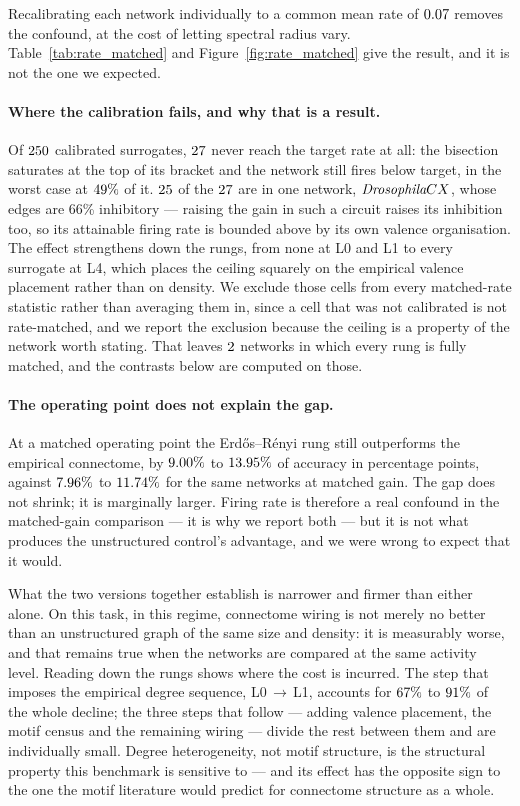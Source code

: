 Recalibrating each network individually to a common mean rate of $0.07$ removes
the confound, at the cost of letting spectral radius vary. Table~\ref{tab:rate_matched}
and Figure~\ref{fig:rate_matched} give the result, and it is not the one we expected.

\paragraph{Where the calibration fails, and why that is a result.}
Of $250$ calibrated surrogates, $27$ never reach the target rate at
all: the bisection saturates at the top of its bracket and the network still fires below
target, in the worst case at $49\%$ of it. $25$ of the
$27$ are in one network, $\textit{Drosophila} CX$, whose edges are 66\%
inhibitory --- raising the gain in such a circuit raises its inhibition too, so its
attainable firing rate is bounded above by its own valence organisation. The effect
strengthens down the rungs, from none at L0 and L1 to every surrogate at L4, which
places the ceiling squarely on the empirical valence placement rather than on density. We exclude those cells from every matched-rate
statistic rather than averaging them in, since a cell that was not calibrated is not
rate-matched, and we report the exclusion because the ceiling is a property of the
network worth stating. That leaves $2$ networks in which every rung
is fully matched, and the contrasts below are computed on those.

\paragraph{The operating point does not explain the gap.}
At a matched operating point the Erd\H{o}s--R\'enyi rung still outperforms the empirical
connectome, by $9.00\%$ to $13.95\%$ of accuracy in
percentage points, against
$7.96\%$ to $11.74\%$ for the same networks at matched gain.
The gap does not shrink; it is marginally larger. Firing rate is therefore a real
confound in the matched-gain comparison --- it is why we report both --- but it is not
what produces the unstructured control's advantage, and we were wrong to expect that it
would.

What the two versions together establish is narrower and firmer than either alone. On
this task, in this regime, connectome wiring is not merely no better than an
unstructured graph of the same size and density: it is measurably worse, and that
remains true when the networks are compared at the same activity level. Reading down the
rungs shows where the cost is incurred. The step that imposes the empirical degree
sequence, L0\,$\rightarrow$\,L1, accounts for $67\%$ to
$91\%$ of the whole decline; the three steps that follow --- adding valence
placement, the motif census and the remaining wiring --- divide the rest between them and
are individually small. Degree heterogeneity, not motif structure, is the
structural property this benchmark is sensitive to --- and its effect has the opposite
sign to the one the motif literature would predict for connectome structure as a whole.

